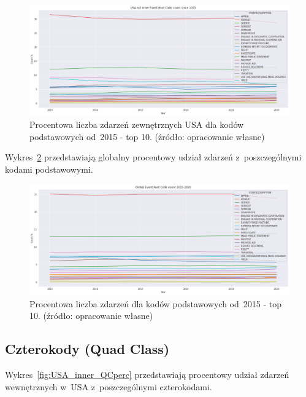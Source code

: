 \documentclass[11pt]{report}
\begin{document}
    \begin{figure}[tp]
        \centering
        \includegraphics[width=\linewidth]{fig/USA not inner/ERCperc.png}
        \caption{Procentowa liczba zdarzeń zewnętrznych USA dla kodów podstawowych od~2015 - top 10. (źródło: opracowanie własne)}
        \label{fig:USA_not_inner_ERCperc}
    \end{figure}

    Wykres~\ref{fig:GLOBAL_ERCperc} przedstawiają globalny procentowy udział zdarzeń z~poszczególnymi kodami podstawowymi.

    \begin{figure}[tp]
        \centering
        \includegraphics[width=\linewidth]{fig/GLOBAL/ERCperc.png}
        \caption{Procentowa liczba zdarzeń dla kodów podstawowych od~2015 - top 10. (źródło: opracowanie własne)}
        \label{fig:GLOBAL_ERCperc}
    \end{figure}

    \subsection{Czterokody (Quad Class)}\label{subsec:czterokodynullquad-classnull2}

    Wykres~\ref{fig:USA_inner_QCperc} przedstawiają procentowy udział zdarzeń wewnętrznych w~USA z~poszczególnymi czterokodami.
\end{document}
